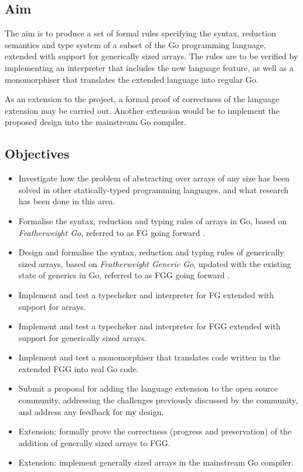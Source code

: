 \subsection{Aim}

The aim is to produce a set of formal rules specifying the syntax, reduction
semantics and type system of a subset of the Go programming language, extended
with support for generically sized arrays. The rules are to be verified by
implementing an interpreter that includes the new language feature, as well
as a monomorphiser that translates the extended language into regular Go.

As an extension to the project, a formal proof of correctness of the language
extension may be carried out. Another extension would be to implement the
proposed design into the mainstream Go compiler.

\subsection{Objectives}

\begin{itemize}
      \item Investigate how the problem of abstracting over arrays of any size
            has been solved in other statically-typed programming languages, and what
            research has been done in this area.
      \item Formalise the syntax, reduction and typing rules of arrays in Go,
            based on \emph{Featherweight Go}, referred to as FG going forward
            \autocite{fg}.
      \item Design and formalise the syntax, reduction and typing rules of
            generically sized arrays, based on \emph{Featherweight Generic Go},
            updated with the existing state of generics in Go, referred to as
            FGG going forward \autocite{fg}.
      \item Implement and test a typecheker and interpreter for FG extended with
            support for arrays.
      \item Implement and test a typecheker and interpreter for FGG extended with
            support for generically sized arrays.
      \item Implement and test a monomorphiser that translates code written in the
            extended FGG into real Go code.
      \item Submit a proposal for adding the language extension to the open
            source community, addressing the challenges previously discussed by
            the community, and address any feedback for my design.
      \item Extension: formally prove the correctness (progress and
            preservation) of the addition of generally sized arrays to FGG.
      \item Extension: implement generally sized arrays in the mainstream Go
            compiler.
\end{itemize}

